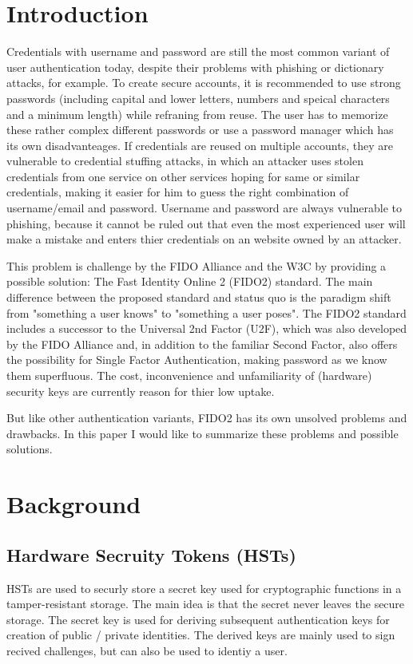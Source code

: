 \documentclass[runningheads]{llncs}
\begin{document}
\section{Introduction}
Credentials with username and password are still the most common variant of user authentication today, despite their problems with phishing or dictionary attacks, for example. To create secure accounts, it is recommended to use strong passwords (including capital and lower letters, numbers and speical characters and a minimum length) while refraning from reuse. The user has to memorize these rather complex different passwords or use a password manager which has its own disadvanteages. If credentials are reused on multiple accounts, they are vulnerable to credential stuffing attacks, in which an attacker uses stolen credentials from one service on other services hoping for same or similar credentials, making it easier for him to guess the right combination of username/email and password. Username and password are always vulnerable to phishing, because it cannot be ruled out that even the most experienced user will make a mistake and enters thier credentials on an website owned by an attacker.

This problem is challenge by the FIDO Alliance and the W3C by providing a possible solution: The Fast Identity Online 2 (FIDO2) standard. The main difference between the proposed standard and status quo is the paradigm shift from "something a user knows" to "something a user poses". The FIDO2 standard includes a successor to the Universal 2nd Factor (U2F), which was also developed by the FIDO Alliance and, in addition to the familiar Second Factor, also offers the possibility for Single Factor Authentication, making password as we know them superfluous. The cost, inconvenience and unfamiliarity of (hardware) security keys are currently reason for thier low uptake.\cite{274547}\cite{9152694}

But like other authentication variants, FIDO2 has its own unsolved problems and drawbacks. In this paper I would like to summarize these problems and possible solutions. 

\section{Background}
\subsection{Hardware Secruity Tokens (HSTs)}
HSTs are used to securly store a secret key used for cryptographic functions in a tamper-resistant storage. The main idea is that the secret never leaves the secure storage. The secret key is used for deriving subsequent authentication keys for creation of public / private identities. The derived keys are mainly used to sign recived challenges, but can also be used to identiy a user.\cite{272198}
\end{document}
